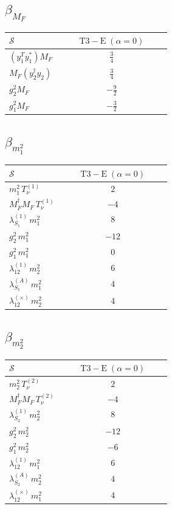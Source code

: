 \documentclass[9pt]{article}
\begin{document}
\subsection*{$ \beta_{M_F} $}
\begin{longtable}{@{}p{0.31\linewidth}c@{}}
\toprule
$\mathcal{S}$ & $ \mathrm{T3-E}\;(\alpha=0) $ \\
\midrule
$ (y_1^T y_1^*)M_F $ & $ \frac{3}{4} $ \\
$ M_F(y_2^\dagger y_2) $ & $ \frac{3}{4} $ \\
$ g_2^2M_F $ & $ - \frac{9}{2} $ \\
$ g_1^2M_F $ & $ - \frac{3}{2} $ \\
\bottomrule
\end{longtable}
\subsection*{$ \beta_{m_1^{2}} $}
\begin{longtable}{@{}p{0.31\linewidth}c@{}}
\toprule
$\mathcal{S}$ & $ \mathrm{T3-E}\;(\alpha=0) $ \\
\midrule
$ m_1^{2}\,T_{\nu}^{(1)} $ & $ 2 $ \\
$ M_F^\dagger M_F\,T_{\nu}^{(1)} $ & $ -4 $ \\
$ \lambda_{S_1}^{(1)}\,m_1^{2} $ & $ 8 $ \\
$ g_2^2\,m_1^{2} $ & $ -12 $ \\
$ g_1^2\,m_1^{2} $ & $ 0 $ \\
$ \lambda_{12}^{(1)}\,m_2^{2} $ & $ 6 $ \\
$ \lambda_{S_1}^{(A)}\,m_1^{2} $ & $ 4 $ \\
$ \lambda_{12}^{(\times)}\,m_2^{2} $ & $ 4 $ \\
\bottomrule
\end{longtable}
\subsection*{$ \beta_{m_2^{2}} $}
\begin{longtable}{@{}p{0.31\linewidth}c@{}}
\toprule
$\mathcal{S}$ & $ \mathrm{T3-E}\;(\alpha=0) $ \\
\midrule
$ m_2^{2}\,T_{\nu}^{(2)} $ & $ 2 $ \\
$ M_F^\dagger M_F\,T_{\nu}^{(2)} $ & $ -4 $ \\
$ \lambda_{S_2}^{(1)}\,m_2^{2} $ & $ 8 $ \\
$ g_2^2\,m_2^{2} $ & $ -12 $ \\
$ g_1^2\,m_2^{2} $ & $ -6 $ \\
$ \lambda_{12}^{(1)}\,m_1^{2} $ & $ 6 $ \\
$ \lambda_{S_2}^{(A)}\,m_2^{2} $ & $ 4 $ \\
$ \lambda_{12}^{(\times)}\,m_1^{2} $ & $ 4 $ \\
\bottomrule
\end{longtable}
\end{document}
